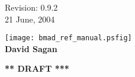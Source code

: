 \thispagestyle{empty}

\begin{flushright}
\large
  Revision: 0.9.2 \\
  21 June, 2004 \\
\end{flushright}

\vfill

{
\begin{center}
\texttt{[image: bmad\_ref\_manual.psfig]} \\
\vskip 0.3in
\huge\bf David Sagan
\end{center}
}

\vskip 1in
\begin{center}
{\Huge \bf *** DRAFT ***}
\end{center}
\vfill
\break